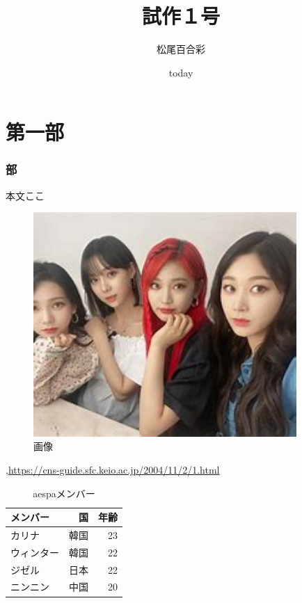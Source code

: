\documentclass{jsarticle}
\title{試作１号}
\author{松尾百合彩}
\date{today}
\begin{document}
\maketitle

\part{第一部}
\section{部}
本文ここ
\begin{figure}[htbp]
\begin{center}
\includegraphics[width=100mm]{aespa.jpg}
\caption{画像}
\end{center}
\end{figure}
\begin{thebibliography}{99}
 ,\url{https://cns-guide.sfc.keio.ac.jp/2004/11/2/1.html}


\end{thebibliography}

\begin{table}[ht]
  \caption{aespaメンバー}
  \label{table:data_type}
  \centering
  \begin{tabular}{lcr}
    \hline
    メンバー  &　国  &  年齢  \\
    \hline \hline
    カリナ  & 韓国  & 23 \\
    ウィンター  & 韓国   & 22 \\
    ジゼル  & 日本  & 22 \\
    ニンニン &  中国  &  20 \\
    \hline
  \end{tabular}
\end{table}
\end{document}
